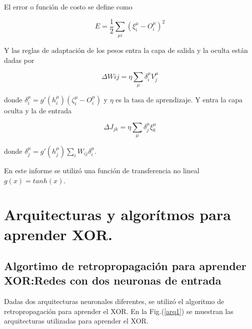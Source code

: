 \documentclass[aps,prb,onecolumn,10pt,floatfix,superscriptaddress]{article} %
\begin{document}
El error o funci\'on de costo se define como 

\begin{equation}
E = \frac{1}{2} \sum_{\mu i} (\xi^{\mu}_{i}-O^{\mu}_{i})^{2}
\end{equation}

Y las reglas de adaptaci\'on de los pesos entra la capa de salida y la oculta est\'an dadas por

\begin{equation}
\Delta W{ij} = \eta \sum_{\mu} \delta^{\mu}_{i} V^{\mu}_{j}
\end{equation}

donde $\delta^{\mu}_{i} = g'(h^{\mu}_{i}) (\zeta^{\mu}_{i}-O^{\mu}_{i})$ y $\eta$ es la tasa de aprendizaje. Y entra la capa oculta y la de entrada 

\begin{equation}
\Delta J_{jk} = \eta \sum_{\mu} \delta^{\mu}_{j} \xi^{\mu}_{k}
\end{equation}

donde $\delta^{\mu}_{j} = g'(h^{\mu}_{j}) \sum_{i} W_{ij} \delta^{\mu}_{i}$.

En este informe se utiliz\'o una funci\'on de transferencia no lineal $g(x) = tanh (x)$.

\section{Arquitecturas y algor\'itmos para aprender XOR.}

\subsection{Algortimo de retropropagaci\'on para aprender XOR:Redes con dos neuronas de entrada}

Dadas dos arquitecturas neuronales diferentes, se utiliz\'o el algoritmo de retropropagaci\'on para aprender el XOR. En la Fig.(\ref{arq1}) se muestran las arquitecturas utilizadas para aprender el XOR.

\pagebreak
\end{document}
